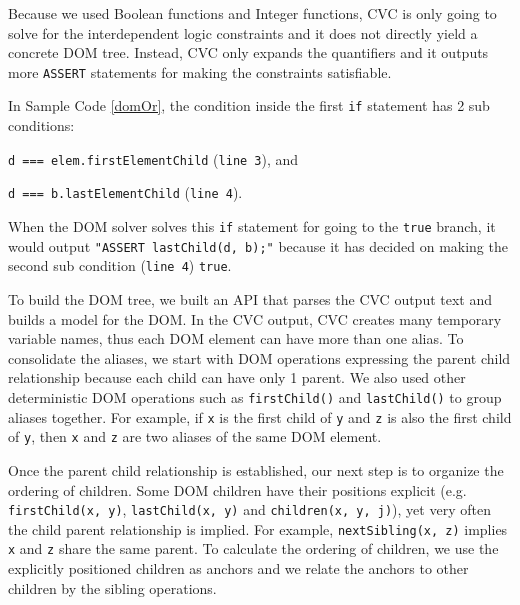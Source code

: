 Because we used Boolean functions and Integer functions, CVC is only going to solve for the interdependent logic constraints and it does not directly yield a concrete DOM tree.  
Instead, CVC only expands the quantifiers and it outputs more {\tt ASSERT} statements for making the constraints satisfiable.  

In Sample Code \ref{domOr}, the condition inside the first {\tt if} statement has 2 sub conditions: 
\begin{compactitem}
\item {\tt d === elem.firstElementChild} ({\tt line 3}), and 
\item {\tt d === b.lastElementChild} ({\tt line 4}).
\end{compactitem}
When the DOM solver solves this {\tt if} statement for going to the {\tt true} branch, it would output {\tt "ASSERT lastChild(d, b);"} because it has decided on making the second sub condition ({\tt line 4}) {\tt true}.

To build the DOM tree, we built an API that parses the CVC output text and builds a model for the DOM.  
In the CVC output, CVC creates many temporary variable names, thus each DOM element can have more than one alias.  
To consolidate the aliases, we start with DOM operations expressing the parent child relationship because each child can have only 1 parent.  
We also used other deterministic DOM operations such as {\tt firstChild()} and {\tt lastChild()} to group aliases together.  
For example, if {\tt x} is the first child of {\tt y} and {\tt z} is also the first child of {\tt y}, then {\tt x} and {\tt z} are two aliases of the same DOM element.  

Once the parent child relationship is established, our next step is to organize the ordering of children.  
Some DOM children have their positions explicit (e.g. {\tt firstChild(x, y)}, {\tt lastChild(x, y)} and {\tt children(x, y, j)}), yet very often the child parent relationship is implied.  For example, {\tt nextSibling(x, z)} implies {\tt x} and {\tt z} share the same parent.  
To calculate the ordering of children, we use the explicitly positioned children as anchors and we relate the anchors to other children by the sibling operations.  



